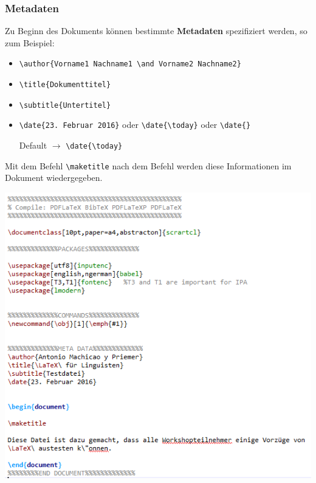 \begin{frame}[fragile]
\frametitle{Metadaten}
Zu Beginn des Dokuments können bestimmte \textbf{Metadaten} spezifiziert werden, so zum Beispiel:

\begin{itemize}
\item \lstinline|\author{Vorname1 Nachname1 \and Vorname2 Nachname2}|
\item \lstinline|\title{Dokumenttitel}| 
\item \lstinline|\subtitle{Untertitel}| 
\item \lstinline|\date{23. Februar 2016}| oder \lstinline|\date{\today}| oder \lstinline|\date{}|\par
Default $\rightarrow$ \lstinline|\date{\today}|
\end{itemize}

Mit dem Befehl \lstinline|\maketitle| nach dem Befehl \lstinline|| werden diese Informationen im Dokument wiedergegeben.
\end{frame}


\begin{frame}[fragile]

\centering
\includegraphics[width=0.72\linewidth]{../../texfiles-beamer/tex-material/WissArb-latex/latexTest4tex}


\end{frame}


